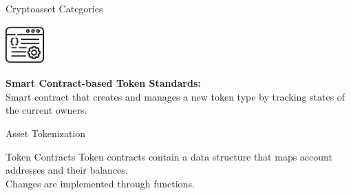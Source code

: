 \documentclass[handout]{beamer}
\begin{document}
\begin{frame}{Cryptoasset Categories}
		\pause
		\vspace{1.5 em}
		\begin{minipage}{0.2\textwidth}
			\begin{center}
				\includegraphics[height=4em]{../assets/images/CA}
			\end{center}
		\end{minipage}
		\begin{minipage}{0.7\textwidth}
			\textbf{Smart Contract-based Token Standards:} \\
			Smart contract that creates and manages a new token type by tracking states of the current owners.	
		\end{minipage}

\end{frame}

\begin{frame}{Asset Tokenization}
	\begin{figure} [h]
 		\center
			
 	\end{figure}
\end{frame}

\begin{frame}{Token Contracts}
	Token contracts contain a data structure that maps account addresses and their balances. \\
	Changes are implemented through functions.

\end{frame}
\end{document}
